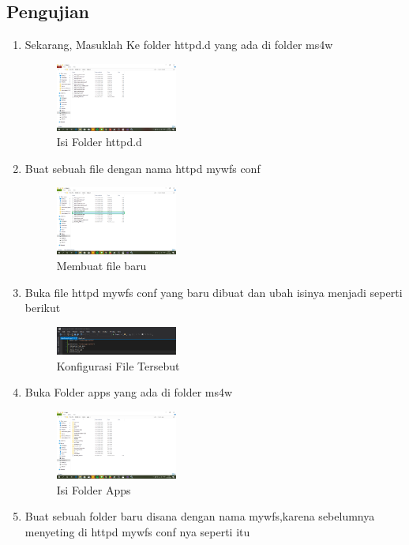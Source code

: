 \subsection{Pengujian}
\begin{enumerate}
  \item Sekarang, Masuklah Ke folder httpd.d yang ada di folder ms4w
  \hfill\break
    \begin{figure}[H]
		\includegraphics[width=4cm]{figures/tugas4/1174053/16.png}
		\centering
		\caption{Isi Folder httpd.d}
    \end{figure}
  \item Buat sebuah file dengan nama httpd mywfs conf
  \hfill\break
    \begin{figure}[H]
		\includegraphics[width=4cm]{figures/tugas4/1174053/17.png}
		\centering
		\caption{Membuat file baru}
    \end{figure}
  \item Buka file httpd mywfs conf yang baru dibuat dan ubah isinya menjadi seperti berikut
  \hfill\break
    \begin{figure}[H]
		\includegraphics[width=4cm]{figures/tugas4/1174053/18.png}
		\centering
		\caption{Konfigurasi File Tersebut}
    \end{figure}
  \item Buka Folder apps yang ada di folder ms4w
  \hfill\break
    \begin{figure}[H]
		\includegraphics[width=4cm]{figures/tugas4/1174053/19.png}
		\centering
		\caption{Isi Folder Apps}
    \end{figure}
  \item Buat sebuah folder baru disana dengan nama mywfs,karena sebelumnya menyeting di httpd mywfs conf nya seperti itu

\end{enumerate}
